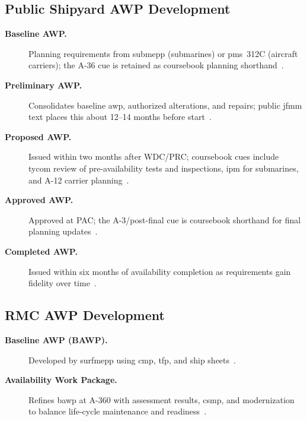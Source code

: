 \documentclass[../main.tex]{subfiles}
\begin{document}
\subsection{Public Shipyard AWP Development}
\begin{description}
  \item[\textbf{Baseline AWP.}] Planning requirements from \ac{submepp} (submarines) or \ac{pms}~312C (aircraft carriers); the A-36 cue is retained as coursebook planning shorthand~\autocite{COMFLTFORCOMINST4790-3,edo-4-2-1-cno-availability-planning-2025}.
  \item[\textbf{Preliminary AWP.}] Consolidates baseline \ac{awp}, authorized alterations, and repairs; public \ac{jfmm} text places this about 12--14 months before start~\autocite{COMFLTFORCOMINST4790-3,edo-4-2-1-cno-availability-planning-2025}.
  \item[\textbf{Proposed AWP.}] Issued within two months after WDC/PRC; coursebook cues include \ac{tycom} review of pre-availability tests and inspections, \ac{ipm} for submarines, and A-12 carrier planning~\autocite{COMFLTFORCOMINST4790-3,edo-4-2-1-cno-availability-planning-2025}.
  \item[\textbf{Approved AWP.}] Approved at PAC; the A-3/post-final cue is coursebook shorthand for final planning updates~\autocite{COMFLTFORCOMINST4790-3,edo-4-2-1-cno-availability-planning-2025}.
  \item[\textbf{Completed AWP.}] Issued within six months of availability completion as requirements gain fidelity over time~\autocite{COMFLTFORCOMINST4790-3,edo-4-2-1-cno-availability-planning-2025}.
\end{description}

\subsection{RMC AWP Development}
\begin{description}
  \item[\textbf{Baseline AWP (BAWP).}] Developed by \ac{surfmepp} using \ac{cmp}, \ac{tfp}, and ship sheets~\autocite{edo-4-2-1-cno-availability-planning-2025}.
  \item[\textbf{Availability Work Package.}] Refines \ac{bawp} at A-360 with assessment results, \ac{csmp}, and modernization to balance life-cycle maintenance and readiness~\autocite{edo-4-2-1-cno-availability-planning-2025}.
\end{description}
\end{document}
